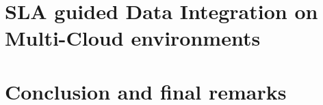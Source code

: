 \documentclass{llncs}
\begin{document}

  







\section{SLA guided Data Integration on Multi-Cloud environments}\label{sec:approach}


\section{Conclusion and final remarks}\label{sec:conc}




\end{document}

